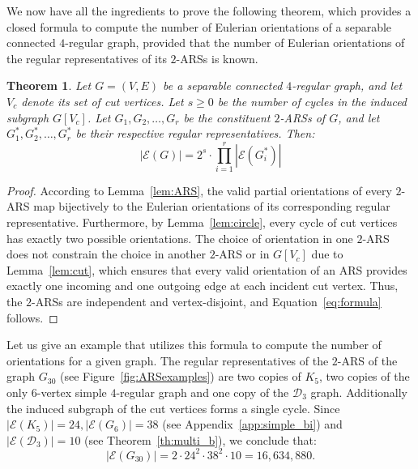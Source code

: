 \documentclass{article}
\newtheorem{theorem}{Theorem}
\begin{document}
        We now have all the ingredients to prove the following theorem, which provides a closed formula to compute the number of Eulerian orientations of a separable connected $4$-regular graph, provided that the number of Eulerian orientations of the regular representatives of its $2$-ARSs is known.
        
        \begin{theorem}\label{th:formula}
            Let $G=(V,E)$ be a separable connected $4$-regular graph, and let $V_c$ denote its set of cut vertices.
            Let $s \geq 0$ be the number of cycles in the induced subgraph $G[V_c]$. 
            Let $G_1, G_2, \dots, G_r$ be the constituent $2$-ARSs of $G$, and let $G^*_1, G^*_2, \dots, G^*_r$ be their respective regular representatives. 
            Then:
            \begin{equation}\label{eq:formula}
                |\mathcal{E}(G)| = 2^s \cdot \prod_{i=1}^r |\mathcal{E}(G^*_i)|
            \end{equation}
        \end{theorem}
        
        \begin{proof}
            According to Lemma~\ref{lem:ARS}, the valid partial orientations of every $2$-ARS map bijectively to the Eulerian orientations of its corresponding regular representative.
            Furthermore, by Lemma~\ref{lem:circle}, every cycle of cut vertices has exactly two possible orientations. 
            The choice of orientation in one $2$-ARS does not constrain the choice in another $2$-ARS or in $G[V_c]$ due to Lemma~\ref{lem:cut}, which ensures that every valid orientation of an ARS provides exactly one incoming and one outgoing edge at each incident cut vertex. 
            Thus, the $2$-ARSs are independent and vertex-disjoint, and Equation~\eqref{eq:formula} follows.
        \end{proof}
        
        Let us give an example that utilizes this formula to compute the number of orientations for a given graph.
        The regular representatives of the $2$-ARS of the graph $G_{30}$ (see Figure~\ref{fig:ARSexamples}) are two copies of $K_5$, two copies of the only $6$-vertex simple $4$-regular graph and one copy of the $\mathcal{D}_3$ graph.
        Additionally the induced subgraph of the cut vertices forms a single cycle.
        Since $|\mathcal{E}(K_5)|=24, |\mathcal{E}(G_6)|=38$ (see Appendix~\ref{app:simple_bi}) and $|\mathcal{E}(\mathcal{D}_3)|=10$ (see Theorem~\ref{th:multi_b}), we conclude that: $$|\mathcal{E} (G_{30})|=2\cdot 24^2 \cdot 38^2 \cdot 10= 16,634,880.$$
        
\end{document}

